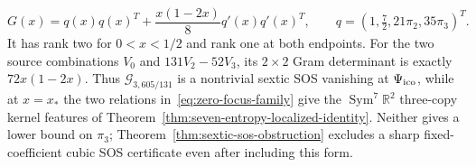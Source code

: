 \begin{proposition}
\begin{equation}\label{eq:zero-focus-gradient-gram}
 G(x)=q(x)q(x)^T+\frac{x(1-2x)}8q'(x)q'(x)^T,
 \qquad q=(1,\tfrac72,21\pi_2,35\pi_3)^T.
\end{equation}
It has rank two for $0<x<1/2$ and rank one at both endpoints.
For the two source combinations $V_0$ and $131V_2-52V_3$, its
$2\times2$ Gram determinant is exactly $72x(1-2x)$.
Thus $\mathcal G_{3,605/131}$ is a nontrivial
sextic SOS vanishing at $\Psi_{\mathrm{ico}}$, while at $x=x_*$ the two relations
in~\eqref{eq:zero-focus-family} give the $\operatorname{Sym}^7\mathbb R^2$
three-copy kernel features of Theorem~\ref{thm:seven-entropy-localized-identity}.
Neither gives a lower bound on $\pi_3$; Theorem~\ref{thm:sextic-sos-obstruction}
excludes a sharp fixed-coefficient cubic SOS certificate even after including this form.
\end{proposition}
